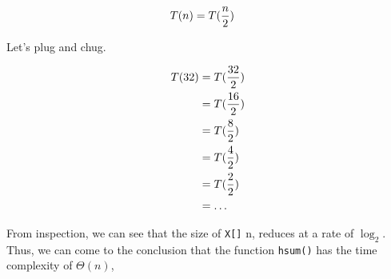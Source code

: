 \begin{align*}
    T(n) &= T({n \over 2})    
\end{align*}

Let's plug and chug.

\begin{align*}
    T(32) &= T({32 \over 2})\\    
          &= T({16 \over 2})\\    
          &= T({8 \over 2})\\    
          &= T({4 \over 2})\\    
          &= T({2 \over 2})\\    
          &= \ldots     
\end{align*}

From inspection, we can see that the size of \texttt{X[]} n,  reduces at a rate of $\log_2$. Thus, we can come to the conclusion that the function \texttt{hsum()} has the time complexity of $\Theta(n)$,



